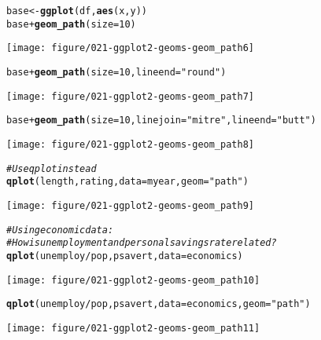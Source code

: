\documentclass[a4paper,titlepage]{tufte-handout}\usepackage[]{graphicx}\usepackage[]{color}
\makeatletter
\def\maxwidth{ %
  \ifdim\Gin@nat@width>\linewidth
    \linewidth
  \else
    \Gin@nat@width
  \fi
}
\newcommand{\hlnum}[1]{\textcolor[rgb]{0.686,0.059,0.569}{#1}}%
\newcommand{\hlstr}[1]{\textcolor[rgb]{0.192,0.494,0.8}{#1}}%
\newcommand{\hlcom}[1]{\textcolor[rgb]{0.678,0.584,0.686}{\textit{#1}}}%
\newcommand{\hlopt}[1]{\textcolor[rgb]{0,0,0}{#1}}%
\newcommand{\hlstd}[1]{\textcolor[rgb]{0.345,0.345,0.345}{#1}}%
\newcommand{\hlkwb}[1]{\textcolor[rgb]{0.69,0.353,0.396}{#1}}%
\newcommand{\hlkwc}[1]{\textcolor[rgb]{0.333,0.667,0.333}{#1}}%
\newcommand{\hlkwd}[1]{\textcolor[rgb]{0.737,0.353,0.396}{\textbf{#1}}}%
\newenvironment{kframe}{%
 \def\at@end@of@kframe{}%
 \ifinner\ifhmode%
  \def\at@end@of@kframe{\end{minipage}}%
  \begin{minipage}{\columnwidth}%
 \fi\fi%
 \def\FrameCommand##1{\hskip\@totalleftmargin \hskip-\fboxsep
 \colorbox{shadecolor}{##1}\hskip-\fboxsep
     \hskip-\linewidth \hskip-\@totalleftmargin \hskip\columnwidth}%
 \MakeFramed {\advance\hsize-\width
   \@totalleftmargin\z@ \linewidth\hsize
   \@setminipage}}%
 {\par\unskip\endMakeFramed%
 \at@end@of@kframe}
\newenvironment{knitrout}{}{} %
\makeatother
\begin{document}
\begin{knitrout}
\begin{kframe}
\begin{alltt}
\hlstd{base} \hlkwb{<-} \hlkwd{ggplot}\hlstd{(df,} \hlkwd{aes}\hlstd{(x, y))}
\hlstd{base} \hlopt{+} \hlkwd{geom_path}\hlstd{(}\hlkwc{size} \hlstd{=} \hlnum{10}\hlstd{)}
\end{alltt}
\end{kframe}
\texttt{[image: figure/021-ggplot2-geoms-geom\_path6]} 
\begin{kframe}\begin{alltt}
\hlstd{base} \hlopt{+} \hlkwd{geom_path}\hlstd{(}\hlkwc{size} \hlstd{=} \hlnum{10}\hlstd{,} \hlkwc{lineend} \hlstd{=} \hlstr{"round"}\hlstd{)}
\end{alltt}
\end{kframe}
\texttt{[image: figure/021-ggplot2-geoms-geom\_path7]} 
\begin{kframe}\begin{alltt}
\hlstd{base} \hlopt{+} \hlkwd{geom_path}\hlstd{(}\hlkwc{size} \hlstd{=} \hlnum{10}\hlstd{,} \hlkwc{linejoin} \hlstd{=} \hlstr{"mitre"}\hlstd{,} \hlkwc{lineend} \hlstd{=} \hlstr{"butt"}\hlstd{)}
\end{alltt}
\end{kframe}
\texttt{[image: figure/021-ggplot2-geoms-geom\_path8]} 
\begin{kframe}\begin{alltt}
\hlcom{# Use qplot instead}
\hlkwd{qplot}\hlstd{(length, rating,} \hlkwc{data}\hlstd{=myear,} \hlkwc{geom}\hlstd{=}\hlstr{"path"}\hlstd{)}
\end{alltt}
\end{kframe}
\texttt{[image: figure/021-ggplot2-geoms-geom\_path9]} 
\begin{kframe}\begin{alltt}
\hlcom{# Using economic data:}
\hlcom{# How is unemployment and personal savings rate related?}
\hlkwd{qplot}\hlstd{(unemploy}\hlopt{/}\hlstd{pop, psavert,} \hlkwc{data}\hlstd{=economics)}
\end{alltt}
\end{kframe}
\texttt{[image: figure/021-ggplot2-geoms-geom\_path10]} 
\begin{kframe}\begin{alltt}
\hlkwd{qplot}\hlstd{(unemploy}\hlopt{/}\hlstd{pop, psavert,} \hlkwc{data}\hlstd{=economics,} \hlkwc{geom}\hlstd{=}\hlstr{"path"}\hlstd{)}
\end{alltt}
\end{kframe}
\texttt{[image: figure/021-ggplot2-geoms-geom\_path11]} 
\begin{kframe}\begin{alltt}

\end{alltt}
\end{kframe}
\end{knitrout}
\end{document}
